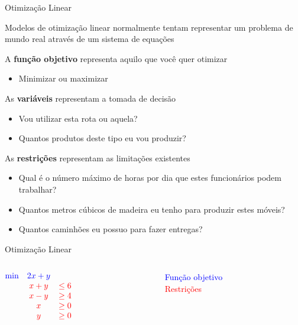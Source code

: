 \documentclass[compress]{beamer}
\begin{document}

\begin{frame}{Otimização Linear}

Modelos de otimização linear normalmente tentam representar um problema de mundo real através de um sistema de equações

A \textbf{função objetivo} representa aquilo que você quer otimizar
\begin{itemize}
    \item Minimizar ou maximizar
\end{itemize}

As \textbf{variáveis} representam a tomada de decisão

\begin{itemize}
    \item Vou utilizar esta rota ou aquela?
    \item Quantos produtos deste tipo eu vou produzir?
\end{itemize}

As \textbf{restrições} representam as limitações existentes

\begin{itemize}
    \item Qual é o número máximo de horas por dia que estes funcionários podem trabalhar?
    \item Quantos metros cúbicos de madeira eu tenho para produzir estes móveis?
    \item Quantos caminhões eu possuo para fazer entregas?
\end{itemize}

\end{frame}


\begin{frame}{Otimização Linear}

\begin{columns}[T]
    \begin{column}{.45\textwidth}
        \vspace{1.8cm}
        $\begin{matrix}
        \textcolor{blue}{\min} & \textcolor{blue}{2x + y}\\ 
             & \textcolor{red}{x + y} & \textcolor{red}{\leq 6} \\ 
             & \textcolor{red}{x - y} & \textcolor{red}{\geq 4} \\ 
             & \textcolor{red}{x} & \textcolor{red}{\geq 0}\\ 
             & \textcolor{red}{y} & \textcolor{red}{\geq 0}
        \end{matrix}    
        $
    \end{column}
    \begin{column}{.43\textwidth}
        \vspace{1.8cm}
        \textcolor{blue}{Função objetivo} \\
        \textcolor{red}{Restrições}
    \end{column}
\end{columns}

\end{frame}
\end{document}
